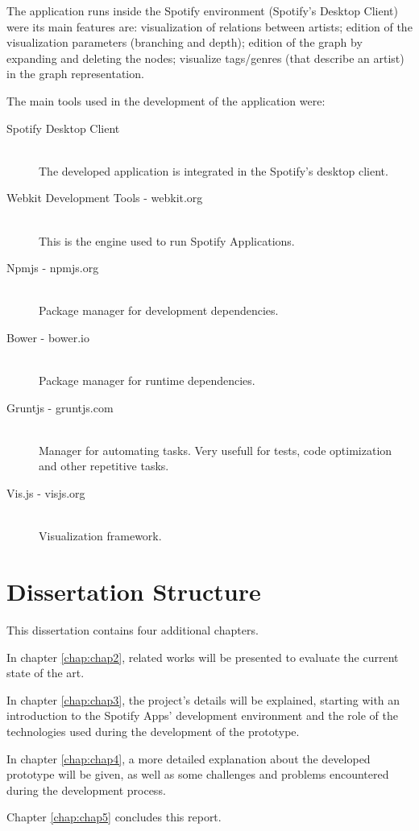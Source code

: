   The application runs inside the Spotify environment (Spotify's Desktop Client) were its main features are: visualization of relations between artists; edition of the visualization parameters (branching and depth); edition of the graph by expanding and deleting the nodes; visualize tags/genres (that describe an artist) in the graph representation.

  The main tools used in the development of the application were:

  \begin{description}
    \item[Spotify Desktop Client] \hfill \\
      The developed application is integrated in the Spotify's desktop client.
    \item[Webkit Development Tools - webkit.org] \hfill \\
      This is the engine used to run Spotify Applications.
    \item[Npmjs - npmjs.org] \hfill \\
      Package manager for development dependencies.
    \item[Bower - bower.io] \hfill \\
      Package manager for runtime dependencies.
    \item[Gruntjs - gruntjs.com] \hfill \\
      Manager for automating tasks. Very usefull for tests, code optimization and other repetitive tasks.
    \item[Vis.js - visjs.org] \hfill \\
      Visualization framework.
  \end{description}


\section{Dissertation Structure} \label{sec:struct}

  This dissertation contains four additional chapters.

  In chapter \ref{chap:chap2}, related works will be presented to evaluate the current state of the art.

  In chapter \ref{chap:chap3}, the project's details will be explained, starting with an introduction to the Spotify Apps' development environment and the role of the technologies used during the development of the prototype.

  In chapter \ref{chap:chap4}, a more detailed explanation about the developed prototype will be given, as well as some challenges and problems encountered during the development process.

  Chapter \ref{chap:chap5} concludes this report.
